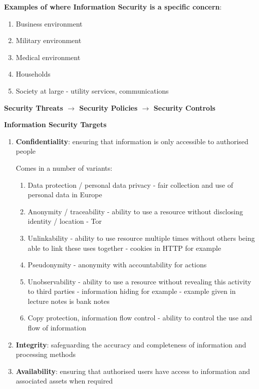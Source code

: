 \documentclass{article}
\begin{document}
\noindent
\textbf{Examples of where Information Security is a specific concern}:
\begin{enumerate}
	\item Business environment
	\item Military environment
	\item Medical environment
	\item Households
	\item Society at large - utility services, communications
\end{enumerate}

\noindent
\textbf{Security Threats $\rightarrow$ Security Policies $\rightarrow$ Security Controls}

\bigskip
\noindent
\textbf{Information Security Targets}
\begin{enumerate}
	\item \textbf{Confidentiality}: ensuring that information is only accessible to authorised people
	
	Comes in a number of variants:
	\begin{enumerate}
		\item Data protection / personal data privacy - fair collection and use of personal data in Europe
		\item Anonymity / traceability - ability to use a resource without disclosing identity / location - Tor
		\item Unlinkability - ability to use  resource multiple times without others being able to link these uses together - cookies in HTTP for example
		\item Pseudonymity - anonymity with accountability for actions
		\item Unobservability - ability to use a resource without revealing this activity to third parties - information hiding for example - example given in lecture notes is bank notes
		\item Copy protection, information flow control - ability to control the use and flow of information
	\end{enumerate}
	
	\item \textbf{Integrity}: safeguarding the accuracy and completeness of information and processing methods
	
	\item \textbf{Availability}: ensuring that authorised users have access to information and associated assets when required
	

\end{enumerate}
\end{document}
